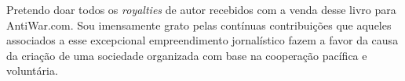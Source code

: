 Pretendo doar todos os \emph{royalties} de autor recebidos com a venda desse livro para AntiWar.com. Sou imensamente grato pelas contínuas contribuições que aqueles associados a esse excepcional empreendimento jornalístico fazem a favor da causa da criação de uma sociedade organizada com base na cooperação pacífica e voluntária.
